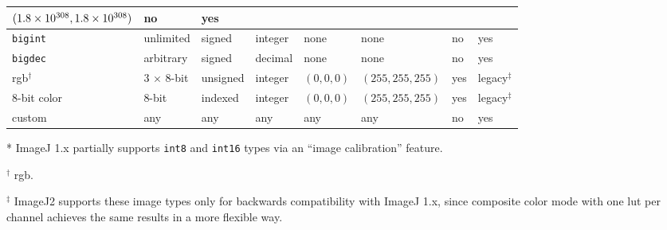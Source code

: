 \documentclass{bmcart}
\begin{document}
\begin{backmatter}
\begin{table}[h!]
\begin{tabular}{| l | l | l | p{0.4in} | p{0.8in} | p{0.8in} | l | l |}
{                                                                                                                        $(1.8 \times 10^{308},\\
                                                                                                                        1.8 \times 10^{308})$
                                                                                                                        }                      & no                  & yes               \\ \hline
      \texttt{bigint}          & unlimited          & signed              & integer         & none                    & none                   & no                  & yes               \\ \hline
      \texttt{bigdec}          & arbitrary          & signed              & decimal         & none                    & none                   & no                  & yes               \\ \hline
      \acrshort{rgb}$^\dagger$ & 3 $\times$ 8-bit   & unsigned            & integer         & $(0, 0, 0)$             & $(255, 255, 255)$      & yes                 & legacy$^\ddagger$ \\ \hline
      8-bit color              & 8-bit              & indexed             & integer         & $(0, 0, 0)$             & $(255, 255, 255)$      & yes                 & legacy$^\ddagger$ \\ \hline
      custom                   & any                & any                 & any             & any                     & any                    & no                  & yes               \\ \hline
    \end{tabular}
    \begin{flushleft}
      * ImageJ 1.x partially supports \texttt{int8} and \texttt{int16} types
      via an ``image calibration'' feature.

      $^\dagger$ \acrfull{rgb}.

      $^\ddagger$ ImageJ2 supports these image types only for backwards
      compatibility with ImageJ 1.x, since composite color mode with one
      \acrshort{lut} per channel achieves the same results in a more flexible
      way.
    \end{flushleft}
  \end{table}

\end{backmatter}
\end{document}
